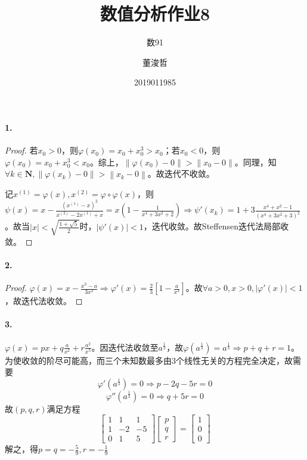 \documentclass{ctexart}
\title{数值分析作业8}
\author{数91\and 董浚哲\and 2019011985}
\begin{document}
\maketitle
\newcommand{\R}{\mathbf{R}}
\newcommand{\dd}{\,\mathrm{d}}
\newcommand{\st}{\text{ s.t. }}
\newcommand{\pp}[2]{\frac{\partial #1}{\partial #2}}
\newcommand{\nm}[1]{\left\|#1\right\|}

\paragraph{1.}
\begin{proof}
若$x_0>0$，则$\varphi(x_0)=x_0+x_0^3>x_0$；若$x_0<0$，则$\varphi(x_0)=x_0+x_0^3<x_0$。综上，$\nm{\varphi(x_0)-0}>\nm{x_0-0}$。同理，知$\forall k\in\mathbf{N}, \nm{\varphi(x_k)-0}>\nm{x_k-0}$。故迭代不收敛。

记$x^{(1)}=\varphi(x),x^{(2)}=\varphi\circ\varphi(x)$，则$\psi(x)=x-\frac{(x^{(1)}-x)^2}{x^{(2)}-2x^{(1)}+x}=x(1-\frac{1}{x^4+3x^2+2})\Rightarrow \psi'(x_k)=1+3\frac{x^4+x^2-1}{(x^4+3x^2+3)^2}$。故当$|x|<\sqrt{\frac{1+\sqrt{5}}{2}}$时，$|\psi'(x)|<1$，迭代收敛。故Steffensen迭代法局部收敛。
\end{proof}

\paragraph{2.}
\begin{proof}
$\varphi(x)=x-\frac{x^3-a}{3x^2}\Rightarrow \varphi'(x)=\frac{2}{3}[1-\frac{a}{x^3}]$。故$\forall a>0,x>0,|\varphi'(x)|<1$，故迭代法收敛。
\end{proof}

\paragraph{3.}
$\varphi(x)=px+q\frac{a}{x^2}+r\frac{a^2}{x^5}$。因迭代法收敛至$a^{\frac{1}{3}}$，故$\varphi(a^{\frac{1}{3}})=a^{\frac{1}{3}}\Rightarrow p+q+r=1$。为使收敛的阶尽可能高，而三个未知数最多由3个线性无关的方程完全决定，故需要
\[\varphi'(a^{\frac{1}{3}})=0\Rightarrow p-2q-5r=0\]
\[\varphi''(a^{\frac{1}{3}})=0\Rightarrow q+5r=0\]
故$(p,q,r)$满足方程
\[\begin{bmatrix}1&1&1\\1&-2&-5\\0&1&5\end{bmatrix}\begin{bmatrix}p\\q\\r\end{bmatrix}=\begin{bmatrix}1\\0\\0\end{bmatrix}\]
解之，得$p=q=-\frac{5}{9},r=-\frac{1}{9}$
\end{document}
